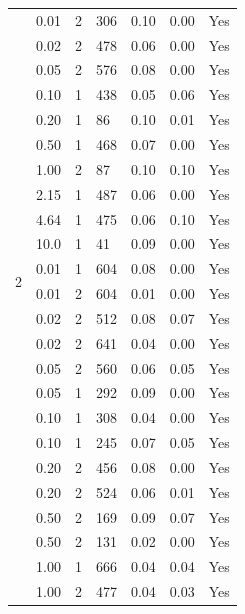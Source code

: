 \begin{longtable}{ | M{2.0cm} | M{2.0cm} | M{1.5cm} | M{1.5cm} | M{2.0cm} | M{2.0cm} | M{1.5cm} | }
\hline
\endlastfoot
          & 0.01 & 2 & 306 & 0.10 & 0.00 & Yes \\
                 & 0.02 & 2 & 478 & 0.06 & 0.00 & Yes \\
                 & 0.05 & 2 & 576 & 0.08 & 0.00 & Yes \\
                 & 0.10 & 1 & 438 & 0.05 & 0.06 & Yes \\
                 & 0.20 & 1 & 86  & 0.10 & 0.01 & Yes \\
                 & 0.50 & 1 & 468 & 0.07 & 0.00 & Yes \\
                 & 1.00 & 2 & 87  & 0.10 & 0.10 & Yes \\
                 & 2.15 & 1 & 487 & 0.06 & 0.00 & Yes \\
                 & 4.64 & 1 & 475 & 0.06 & 0.10 & Yes \\
                 & 10.0 & 1 & 41  & 0.09 & 0.00 & Yes \\
         \hline
          & 0.01 & 1 & 604 & 0.08 & 0.00 & Yes \\
                 & 0.01 & 2 & 604 & 0.01 & 0.00 & Yes \\
                 & 0.02 & 2 & 512 & 0.08 & 0.07 & Yes \\
                 & 0.02 & 2 & 641 & 0.04 & 0.00 & Yes \\
                 & 0.05 & 2 & 560 & 0.06 & 0.05 & Yes \\
                 & 0.05 & 1 & 292 & 0.09 & 0.00 & Yes \\
                 & 0.10 & 1 & 308 & 0.04 & 0.00 & Yes \\
                 & 0.10 & 1 & 245 & 0.07 & 0.05 & Yes \\
                 & 0.20 & 2 & 456 & 0.08 & 0.00 & Yes \\
                 & 0.20 & 2 & 524 & 0.06 & 0.01 & Yes \\
                 & 0.50 & 2 & 169 & 0.09 & 0.07 & Yes \\
                 & 0.50 & 2 & 131 & 0.02 & 0.00 & Yes \\
                 & 1.00 & 1 & 666 & 0.04 & 0.04 & Yes \\
                 & 1.00 & 2 & 477 & 0.04 & 0.03 & Yes \\

\end{longtable}
